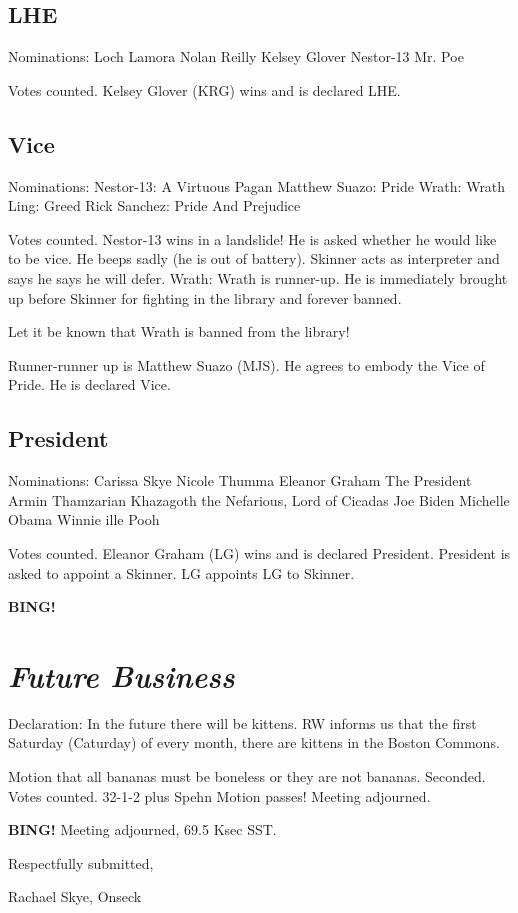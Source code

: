 \documentclass[10pt]{article}
\newcommand{\bing}{{\bf BING!} }
\newcommand{\goto}[1]{\bing \vskip 12pt \section*{{\em{#1}}}}
\newcommand{\ps}{ plus Spehn\xspace}
\newcommand{\onseck}{Rachael Skye, Onseck}
\begin{document}
\subsection*{LHE}

Nominations:
Loch Lamora
Nolan Reilly
Kelsey Glover
Nestor-13
Mr. Poe

Votes counted. Kelsey Glover (KRG) wins and is declared LHE.

\subsection*{Vice}

Nominations:
Nestor-13: A Virtuous Pagan
Matthew Suazo: Pride
Wrath: Wrath
Ling: Greed
Rick Sanchez: Pride And Prejudice

Votes counted. Nestor-13 wins in a landslide! He is asked whether he would like to be vice. He beeps sadly (he is out of battery). Skinner acts as interpreter and says he says he will defer. Wrath: Wrath is runner-up. He is immediately brought up before Skinner for fighting in the library and forever banned.

Let it be known that Wrath is banned from the library!

Runner-runner up is Matthew Suazo (MJS). He agrees to embody the Vice of Pride. He is declared Vice.

\subsection*{President}

Nominations:
Carissa Skye
Nicole Thumma
Eleanor Graham
The President
Armin Thamzarian
Khazagoth the Nefarious, Lord of Cicadas
Joe Biden
Michelle Obama
Winnie ille Pooh

Votes counted. Eleanor Graham (LG) wins and is declared President.
President is asked to appoint a Skinner.
LG appoints LG to Skinner.

\goto{Future Business}

Declaration: In the future there will be kittens. RW informs us that the first Saturday (Caturday) of every month, there are kittens in the Boston Commons.

Motion that all bananas must be boneless or they are not bananas.
Seconded.
Votes counted.
32-1-2\ps
Motion passes! Meeting adjourned.

\bing
\noindent
Meeting adjourned, 69.5 Ksec SST.

\vspace{18pt}

\centerline{Respectfully submitted,}
\centerline{\onseck}
\end{document}

